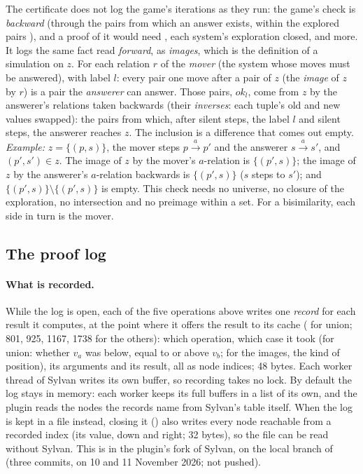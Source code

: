 The certificate does not log the game's iterations as they run: the
game's check is \emph{backward} (through the pairs from which an answer
exists, within the explored pairs ), and a proof of it would
need , each system's exploration closed, and more. It logs the
same fact read \emph{forward}, as \emph{images}, which is the definition
of a simulation on $z$. For each relation $r$ of the \emph{mover} (the
system whose moves must be answered), with label $l$: every pair one
move after a pair of $z$ (the \emph{image} of $z$ by $r$) is a pair the
\emph{answerer} can answer. Those pairs, $\mathit{ok}_l$, come from $z$ by
the answerer's relations taken backwards (their \emph{inverses}: each
tuple's old and new values swapped): the pairs from which, after silent
steps, the label $l$ and silent steps, the answerer reaches $z$. The
inclusion is a difference that comes out empty. \emph{Example:}
$z = \{(p, s)\}$, the mover steps $p \xrightarrow{a} p'$ and the answerer
$s \xrightarrow{a} s'$, and $(p', s') \in z$. The image of $z$ by the
mover's $a$-relation is $\{(p', s)\}$; the image of $z$ by the answerer's
$a$-relation backwards is $\{(p', s)\}$ ($s$ steps to $s'$); and
$\{(p', s)\} \setminus \{(p', s)\}$ is empty. This check needs no
universe, no closure of the exploration, no intersection and no preimage
within a set. For a bisimilarity, each side in turn is the mover.

\subsection{The proof log}\label{sec:prooflog:log}

\paragraph{What is recorded.} While the log is open, each of the five
operations above writes one \emph{record} for each result it computes, at
the point where it offers the result to its cache
( for union; 801, 925, 1167, 1738
for the others): which operation, which case it took (for union: whether
$v_a$ was below, equal to or above $v_b$; for the images, the kind of
position), its arguments and its result, all as node indices; 48 bytes.
Each worker thread of Sylvan writes its own buffer, so recording takes no
lock. By default the log stays in memory: each worker keeps its full
buffers in a list of its own, and the plugin reads the nodes the records
name from Sylvan's table itself. When the log is kept in a file instead,
closing it () also writes every node reachable from
a recorded index (its value, down and right; 32 bytes), so the file can
be read without Sylvan. This is in the plugin's fork of Sylvan, on the
local branch  of  (three commits, on
10 and 11 November 2026; not pushed).

